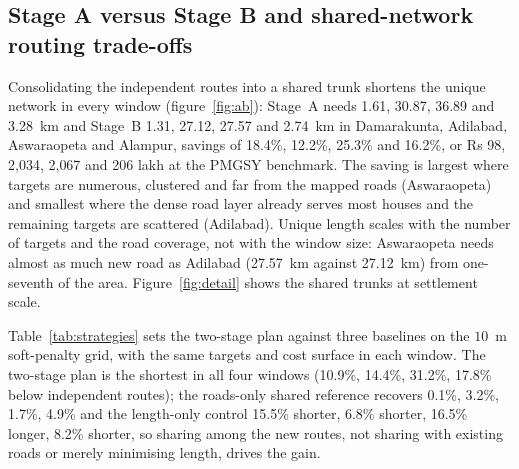 \documentclass[preprint,12pt]{elsarticle}
\newcommand{\dinoseg}{StrongDINOv2Seg}
\begin{document}
\begin{table}[htbp]
\caption{Four study windows side by side. Segmentation rows: LoveDA validation of the single \dinoseg{} checkpoint (overall accuracy is the share of correctly classified pixels; precision and recall are macro averages over classes; F1-score equals the mean Dice coefficient; mIoU is the mean intersection over union). Stage~A is independent least-cost routing and Stage~B the shared-trunk network; PMGSY is the Pradhan Mantri Gram Sadak Yojana rural road programme; 1 lakh $=10^{5}$ INR (Indian rupees); slope is the mean terrain slope in percent. Routing rows: unique lengths on the 5~m zero-crossing grid (shared edges once); building crossings are routes inside another building's footprint; cost is the Stage~B length times Rs 75 lakh per km (range 60--90).}
\label{tab:four}
\centering
\scriptsize
\resizebox{\textwidth}{!}{}
\end{table}

\subsection{Stage A versus Stage B and shared-network routing trade-offs}\label{sec:res3}
Consolidating the independent routes into a shared trunk shortens the unique network in every window (figure~\ref{fig:ab}): Stage~A needs 1.61, 30.87, 36.89 and 3.28~km and Stage~B 1.31, 27.12, 27.57 and 2.74~km in Damarakunta, Adilabad, Aswaraopeta and Alampur, savings of 18.4\%, 12.2\%, 25.3\% and 16.2\%, or Rs 98, 2{,}034, 2{,}067 and 206 lakh at the PMGSY benchmark. The saving is largest where targets are numerous, clustered and far from the mapped roads (Aswaraopeta) and smallest where the dense road layer already serves most houses and the remaining targets are scattered (Adilabad). Unique length scales with the number of targets and the road coverage, not with the window size: Aswaraopeta needs almost as much new road as Adilabad (27.57~km against 27.12~km) from one-seventh of the area. Figure~\ref{fig:detail} shows the shared trunks at settlement scale.

Table~\ref{tab:strategies} sets the two-stage plan against three baselines on the $10$~m soft-penalty grid, with the same targets and cost surface in each window. The two-stage plan is the shortest in all four windows (10.9\%, 14.4\%, 31.2\%, 17.8\% below independent routes); the roads-only shared reference recovers 0.1\%, 3.2\%, 1.7\%, 4.9\% and the length-only control 15.5\% shorter, 6.8\% shorter, 16.5\% longer, 8.2\% shorter, so sharing among the new routes, not sharing with existing roads or merely minimising length, drives the gain.
\end{document}
